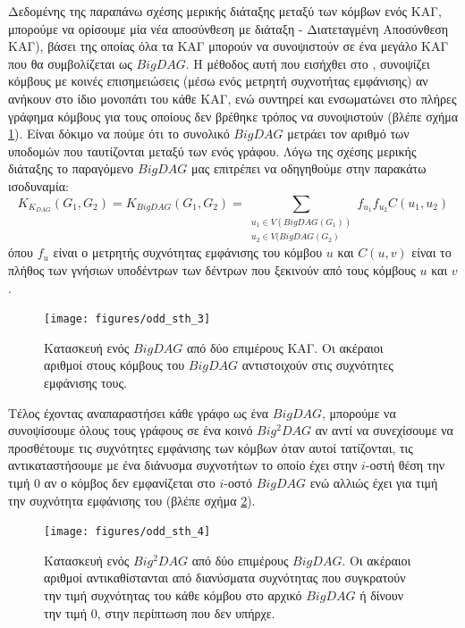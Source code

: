 Δεδομένης της παραπάνω σχέσης μερικής διάταξης μεταξύ των κόμβων ενός ΚΑΓ, μπορούμε να ορίσουμε μία νέα αποσύνθεση με διάταξη  - Διατεταγμένη Αποσύνθεση ΚΑΓ), βάσει της οποίας όλα τα ΚΑΓ μπορούν να συνοψιστούν σε ένα μεγάλο ΚΑΓ που θα συμβολίζεται ως $BigDAG$.
Η μέθοδος αυτή που εισήχθει στο \cite[MinimalDAG:  2, p. 3]{Martino2006}, συνοψίζει κόμβους με κοινές επισημειώσεις (μέσω ενός μετρητή συχνοτήτας εμφάνισης) αν ανήκουν στο ίδιο μονοπάτι του κάθε ΚΑΓ, ενώ συντηρεί και ενσωματώνει στο πλήρες γράφημα κόμβους για τους οποίους δεν βρέθηκε τρόπος να συνοψιστούν  (βλέπε σχήμα \ref{fig:odd_sth_3}).
Είναι δόκιμο να πούμε ότι το συνολικό $BigDAG$ μετράει τον αριθμό των υποδομών που ταυτίζονται μεταξύ των  ενός γράφου.
Λόγω της σχέσης μερικής διάταξης το παραγόμενο $BigDAG$ μας επιτρέπει να οδηγηθούμε στην παρακάτω ισοδυναμία:
\begin{equation}
K_{K_{DAG}}(G_{1}, G_{2}) = K_{BigDAG}(G_{1}, G_{2}) = \sum_{\substack{u_{1} \in V(BigDAG(G_{1}))\\ u_{2} \in V(BigDAG(G_{2})}} f_{u_{1}}f_{u_{2}}C(u_{1}, u_{2})
\end{equation}
όπου $f_{u}$ είναι ο μετρητής συχνότητας εμφάνισης του κόμβου $u$ και $C(u, v)$ είναι το πλήθος των γνήσιων υποδέντρων των δέντρων που ξεκινούν από τους κόμβους $u$ και $v$.
\begin{figure}[]
\centering
\texttt{[image: figures/odd\_sth\_3]}
\caption[Κατασκευή ενός $BigDAG$ από δύο επιμέρους ΚΑΓ.]{Κατασκευή ενός $BigDAG$ από δύο επιμέρους ΚΑΓ. Οι ακέραιοι αριθμοί στους κόμβους του $BigDAG$ αντιστοιχούν στις συχνότητες εμφάνισης τους.}
\label{fig:odd_sth_3}
\end{figure}

Τέλος έχοντας αναπαραστήσει κάθε γράφο ως ένα $BigDAG$, μπορούμε να συνοψίσουμε όλους τους γράφους σε ένα κοινό $Big^{2}DAG$ αν αντί να συνεχίσουμε να προσθέτουμε τις συχνότητες εμφάνισης των κόμβων όταν αυτοί τατίζονται, τις αντικαταστήσουμε με ένα διάνυσμα συχνοτήτων το οποίο έχει στην $i$-οστή θέση την τιμή $0$ αν ο κόμβος δεν εμφανίζεται στο $i$-οστό $BigDAG$ ενώ αλλιώς έχει για τιμή την συχνότητα εμφάνισης του (βλέπε σχήμα \ref{fig:odd_sth_4}).
\begin{figure}[]
\centering
\texttt{[image: figures/odd\_sth\_4]}
\caption[Κατασκευή ενός $Big^{2}DAG$ από δύο επιμέρους $BigDAG$.]{Κατασκευή ενός $Big^{2}DAG$ από δύο επιμέρους $BigDAG$. Οι ακέραιοι αριθμοί αντικαθίστανται από διανύσματα συχνότητας που συγκρατούν την τιμή συχνότητας του κάθε κόμβου στο αρχικό $BigDAG$ ή δίνουν την τιμή $0$, στην περίπτωση που δεν υπήρχε.}
\label{fig:odd_sth_4}
\end{figure}

